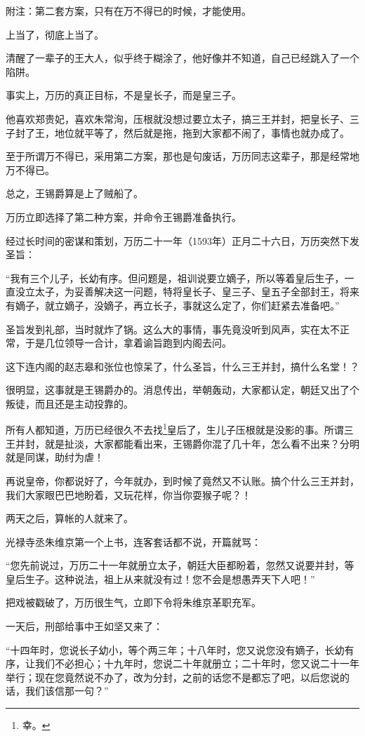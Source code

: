 \begin{multicols}{\theparacolNo}
		附注：第二套方案，只有在万不得已的时候，才能使用。

		上当了，彻底上当了。

		清醒了一辈子的王大人，似乎终于糊涂了，他好像并不知道，自己已经跳入了一个陷阱。

		事实上，万历的真正目标，不是皇长子，而是皇三子。

		他喜欢郑贵妃，喜欢朱常洵，压根就没想过要立太子，搞三王并封，把皇长子、三子封了王，地位就平等了，然后就是拖，拖到大家都不闹了，事情也就办成了。

		至于所谓万不得已，采用第二方案，那也是句废话，万历同志这辈子，那是经常地万不得已。

		总之，王锡爵算是上了贼船了。

		万历立即选择了第二种方案，并命令王锡爵准备执行。

		经过长时间的密谋和策划，万历二十一年（1593年）正月二十六日，万历突然下发圣旨：

		“我有三个儿子，长幼有序。但问题是，祖训说要立嫡子，所以等着皇后生子，一直没立太子，为妥善解决这一问题，特将皇长子、皇三子、皇五子全部封王，将来有嫡子，就立嫡子，没嫡子，再立长子，事就这么定了，你们赶紧去准备吧。”

		圣旨发到礼部，当时就炸了锅。这么大的事情，事先竟没听到风声，实在太不正常，于是几位领导一合计，拿着谕旨跑到内阁去问。

		这下连内阁的赵志皋和张位也惊呆了，什么圣旨，什么三王并封，搞什么名堂！？

		很明显，这事就是王锡爵办的。消息传出，举朝轰动，大家都认定，朝廷又出了个叛徒，而且还是主动投靠的。

		所有人都知道，万历已经很久不去找\footnote{幸。}皇后了，生儿子压根就是没影的事。所谓三王并封，就是扯淡，大家都能看出来，王锡爵你混了几十年，怎么看不出来？分明就是同谋，助纣为虐！

		再说皇帝，你都说好了，今年就办，到时候了竟然又不认账。搞个什么三王并封，我们大家眼巴巴地盼着，又玩花样，你当你耍猴子呢？！

		两天之后，算帐的人就来了。

		光禄寺丞朱维京第一个上书，连客套话都不说，开篇就骂：

		“您先前说过，万历二十一年就册立太子，朝廷大臣都盼着，忽然又说要并封，等皇后生子。这种说法，祖上从来就没有过！您不会是想愚弄天下人吧！”

		把戏被戳破了，万历很生气，立即下令将朱维京革职充军。

		一天后，刑部给事中王如坚又来了：

		“十四年时，您说长子幼小，等个两三年；十八年时，您又说您没有嫡子，长幼有序，让我们不必担心；十九年时，您说二十年就册立；二十年时，您又说二十一年举行；现在您竟然说不办了，改为分封，之前的话您不是都忘了吧，以后您说的话，我们该信那一句？”


\end{multicols}
